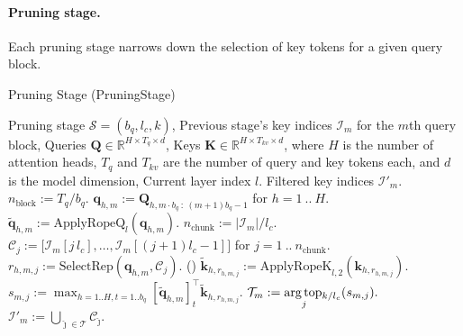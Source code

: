 \paragraph{Pruning stage.} Each pruning stage narrows down the selection of key tokens for a given query block.
\begin{algorithm}[H]
\caption{\ours Pruning Stage (PruningStage)}\label{alg:pruning_stage}
\begin{algorithmic}[1]
\INPUT Pruning stage $\mathcal{S} = (b_q, l_c, k)$, Previous stage's key indices $\mathcal{I}_m$ for the $m$th query block, Queries $\bm{Q}\in \mathbb{R}^{H\times T_q\times d}$, Keys $\bm{K}\in \mathbb{R}^{H\times T_{kv}\times d}$, where $H$ is the number of attention heads, $T_q$ and $T_{kv}$ are the number of query and key tokens each, and $d$ is the model dimension, Current layer index $l$.
\OUTPUT Filtered key indices $\mathcal{I}'_m$.
\STATE $n_\text{block} := T_{q} / b_q$.
\STATE $\bm{q}_{h,m} := \bm{Q}_{h, m\cdot b_q~:~(m+1)b_q-1}$ for $h = 1~..~H$. 
\STATE $\tilde{\bm{q}}_{h,m} := \text{ApplyRopeQ}_{l}(\bm{q}_{h,m})$.
\STATE $n_\text{chunk} := |\mathcal{I}_m|/l_c$.
\STATE $\mathcal{C}_j := \big[\mathcal{I}_m [j\, l_c],\dots,\mathcal{I}_m [(j+1) l_c-1]\big]$ for $j=1~..~n_\text{chunk}$. 
        \STATE $r_{h,m,j} := \text{SelectRep}(\bm{q}_{h,m}, \mathcal{C}_j).$ () 
    \ENDFOR
    \STATE $\tilde{\bm{k}}_{h,r_{h,m,j}} := \text{ApplyRopeK}_{l,2}(\bm{k}_{h,r_{h,m,j}}).$
    \STATE $s_{m,j} := \max_{h=1..H, t=1..b_q} \left[\tilde{\bm{q}}_{h,m}\right]_{t}^\top \tilde{\bm{k}}_{h,r_{h,m,j}}.$ 
\ENDFOR
\STATE $\mathcal{T}_m := \underset{j}{\text{arg\,top\,}}\!_{k/l_c} (s_{m,j}).$ 
\STATE $\mathcal{I}'_m := \bigcup_{\hat{\jmath}\in\mathcal{T}} \mathcal{C}_{\hat{\jmath}}.$
\end{algorithmic}
\end{algorithm}

